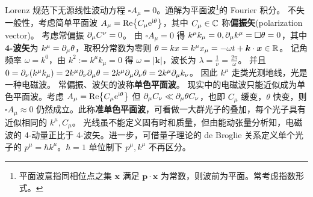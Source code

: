 Lorenz 规范下无源线性波动方程 $\square A_\mu = 0$。通解为平面波\footnote{平面波意指同相位点之集 $\bm x$ 满足 $\bm p\cdot\bm x$ 为常数，则波前为平面。常考虑指数形式。}的 Fourier 积分。
不失一般性，考虑简单平面波 $A_\mu = \Re{C_\mu \mathrm{e}^{\mathrm{i}\theta}}$，其中 $C_\mu\in\mathbb{C}$ 称\textbf{偏振矢}(polarization vector)。
考虑常偏振 $\partial_\mu C^\nu = 0$。
由 $\square A_\mu = 0$ 得 $k^\mu k_\mu = 0,\partial_\mu k^\mu=\square\theta=0$，其中 \textbf{4-波矢}为 $k^\mu = \partial_\mu\theta$，取积分常数为零则 $\theta = kx = k^\mu x_\mu = -\omega t+\bm k\cdot\bm x \in \mathbb{R}$。
记角频率 $\omega=k^0$，由 $k^2:=k^\mu k_\mu=0$ 得 $\omega=|\bm k|$，波长为 $\lambda = \frac{1}{\nu} = \frac{2\pi}{\omega}$。
并且 $0=\partial_\nu(k^\mu k_\mu) = 2k^\mu\partial_\nu \partial_\mu \theta =  2k^\mu\partial_\mu \partial_\nu \theta = 2k^\mu \partial_\mu k_\nu$。
因此 $k^\mu$ 走类光测地线，光是一种电磁波。
常偏振、波矢的波称\textbf{单色平面波}。
现实中的电磁波只能近似成为单色平面波。考虑 $A_\mu = \Re{C_\mu \mathrm{e}^{\mathrm{i}\theta}}$ 但 $\partial_\mu C_\nu \ll \partial_\mu\theta C_\nu$，也即 $C_\mu$ 缓变，$\theta$ 快变，则 $\square A_\mu \approx 0$ 仍然成立。此称\textbf{准单色平面波}，可看做一大群光子的叠加，每个光子具有近似相同的 $k^\mu,C_\mu$。
光线虽不能定义固有时和质量，但由能动张量分析知，电磁波的 4-动量正比于 4-波矢。进一步，可借量子理论的 de Broglie 关系定义单个光子的 $p^\mu=\hbar k^\mu$。$\hbar = 1$ 单位制下 $p^\mu,k^\mu$ 不再区分。

